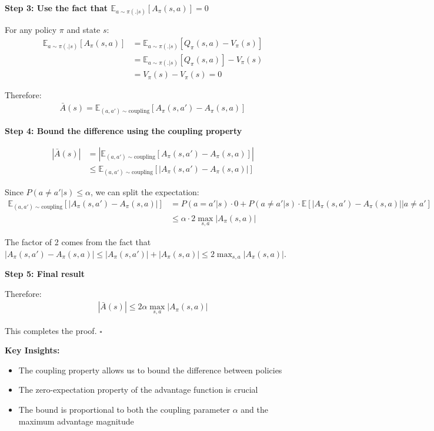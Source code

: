 \textbf{Step 3: Use the fact that $\mathbb{E}_{a \sim \pi(.|s)}[A_{\pi}(s, a)] = 0$}

For any policy $\pi$ and state $s$:
\begin{align}
\mathbb{E}_{a \sim \pi(.|s)}[A_{\pi}(s, a)] &= \mathbb{E}_{a \sim \pi(.|s)}[Q_{\pi}(s, a) - V_{\pi}(s)] \\
&= \mathbb{E}_{a \sim \pi(.|s)}[Q_{\pi}(s, a)] - V_{\pi}(s) \\
&= V_{\pi}(s) - V_{\pi}(s) = 0
\end{align}

Therefore:
\begin{align}
\bar{A}(s) = \mathbb{E}_{(a,a') \sim \text{coupling}}[A_{\pi}(s, a') - A_{\pi}(s, a)]
\end{align}

\textbf{Step 4: Bound the difference using the coupling property}

\begin{align}
|\bar{A}(s)| &= \left| \mathbb{E}_{(a,a') \sim \text{coupling}}[A_{\pi}(s, a') - A_{\pi}(s, a)] \right| \\
&\le \mathbb{E}_{(a,a') \sim \text{coupling}}[|A_{\pi}(s, a') - A_{\pi}(s, a)|]
\end{align}

Since $P(a \neq a'|s) \le \alpha$, we can split the expectation:
\begin{align}
\mathbb{E}_{(a,a') \sim \text{coupling}}[|A_{\pi}(s, a') - A_{\pi}(s, a)|] &= P(a = a'|s) \cdot 0 + P(a \neq a'|s) \cdot \mathbb{E}[|A_{\pi}(s, a') - A_{\pi}(s, a)| | a \neq a'] \\
&\le \alpha \cdot 2\max_{s, a}|A_{\pi}(s,a)|
\end{align}

The factor of 2 comes from the fact that $|A_{\pi}(s, a') - A_{\pi}(s, a)| \le |A_{\pi}(s, a')| + |A_{\pi}(s, a)| \le 2\max_{s, a}|A_{\pi}(s,a)|$.

\textbf{Step 5: Final result}

Therefore:
\begin{align}
|\bar{A}(s)| \le 2\alpha \max_{s, a}|A_{\pi}(s,a)|
\end{align}

This completes the proof. $\square$

\textbf{Key Insights:}
\begin{itemize}
    \item The coupling property allows us to bound the difference between policies
    \item The zero-expectation property of the advantage function is crucial
    \item The bound is proportional to both the coupling parameter $\alpha$ and the maximum advantage magnitude
\end{itemize}

